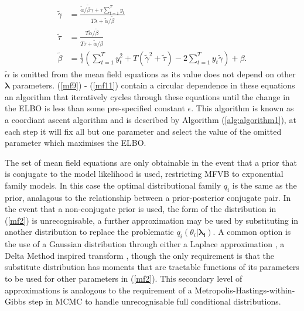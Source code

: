 \documentclass[12pt,a4paper]{article}%
\numberwithin{equation}{section}
\begin{document}
\begin{align}
\tilde{\gamma} &= \frac{\tilde{\alpha} / \tilde{\beta} \gamma + \tau \sum_{t=1}^{T} y_t} {T \lambda + \tilde{\alpha} / \tilde{\beta}} \label{mf9} \\ 
\tilde{\tau} &= \frac{T \tilde{\alpha} / \tilde{\beta}}{T \tau + \tilde{\alpha} / \tilde{\beta}} \label{mf10} \\
\tilde{\beta} &= \frac{1}{2} \left(\sum_{t=1}^{T} y_t^2 + T(\tilde{\gamma}^2 + \tilde{\tau}) - 2 \sum_{t=1}^{T} y_t \tilde{\gamma} \right) + \beta. \label{mf11}
\end{align}
$\tilde{\alpha}$ is omitted from the mean field equations as its value does not depend on other $\boldsymbol{\lambda}$ parameters. (\ref{mf9}) - (\ref{mf11}) contain a circular dependence in these equations an algorithm that iteratively cycles through these equations until the change in the ELBO is less than some pre-specified constant $\epsilon$. This algorithm is known as a coordiant ascent algorithm and is described by Algorithm (\ref{alg:algorithm1}), at each step it will fix all but one parameter and select the value of the omitted parameter which maximises the ELBO.

The set of mean field equations are only obtainable in the event that a prior that is conjugate to the model likelihood is used, restricting MFVB to exponential family models. In this case the optimal distributional family $q_i$ is the same as the prior, analagous to the relationship between a prior-posterior conjugate pair. In the event that a non-conjugate prior is used, the form of the distribution in (\ref{mf2}) is unrecognisable, a further approximation may be used by substituting in another distribution to replace the problematic $q_i(\theta_i |\boldsymbol{\lambda_i}).$ A common option is the use of a Gaussian distribution through either a Laplace approximation \citep{Friston2006}, a Delta Method inspired transform \citet{Wang2013}, though the only requirement is that the substitute distribution has moments that are tractable functions of its parameters to be used for other parameters in (\ref{mf2}). This secondary level of approximations is analogous to the requirement of a Metropolis-Hastings-within-Gibbs step in MCMC to handle unrecognisable full conditional distributions.
\end{document}
